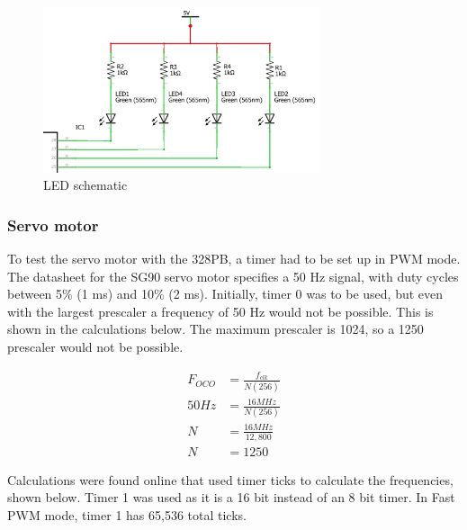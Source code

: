 \documentclass{article}
\begin{document}
	    \begin{figure}[!ht]
	        \begin{center}
	        \includegraphics[width=230pt]{LED_schem.png}
		    \caption{LED schematic}
		    \label{fig:led_schem}
		    \end{center}
	    \end{figure}
        
        \subsubsection{Servo motor}
        To test the servo motor with the 328PB, a timer had to be set up in PWM mode. The datasheet for the SG90 servo motor specifies a 50 Hz signal, with duty cycles between 5\% (1 ms) and 10\% (2 ms). Initially, timer 0 was to be used, but even with the largest prescaler a frequency of 50 Hz would not be possible. This is shown in the calculations below. The maximum prescaler is 1024, so a 1250 prescaler would not be possible.
        
        \begin{equation}
            \begin{split}\label{eq:timer0}
            F_{OCO} &= \frac{f_{clk}}{N(256)} \\
            50 Hz &= \frac{16 MHz}{N(256)} \\
            N &= \frac{16 MHz}{12,800} \\
            N &= 1250
            \end{split}
        \end{equation}
        
       
        Calculations were found online \cite{project_overview:servo_tutorial} that used timer ticks to calculate the frequencies, shown below. Timer 1 was used as it is a 16 bit instead of an 8 bit timer. In Fast PWM mode, timer 1 has 65,536 total ticks.
        
\end{document}
